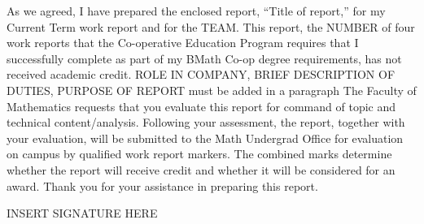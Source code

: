 \documentclass[12pt]{article}
\newcommand{\term}{Current Term } %
\newcommand{\WTT}{Title of report}
\begin{document}




\FirstPage

\newpage




\LetterHead



As we agreed, I have prepared the enclosed report, “\WTT,” for
my \term work report and for the TEAM. This
report, the NUMBER of four work reports that the Co-operative Education Program
requires that I successfully complete as part of my BMath Co-op degree
requirements, has not received academic credit.
\vskip 10pt
ROLE IN COMPANY, BRIEF DESCRIPTION OF DUTIES, PURPOSE OF REPORT must be added in a paragraph
\vskip 10pt 
The Faculty of Mathematics requests that you evaluate this report for command
of topic and technical content/analysis. Following your assessment, the report,
together with your evaluation, will be submitted to the Math Undergrad Office
for evaluation on campus by qualified work report markers. The combined
marks determine whether the report will receive credit and whether it will be
considered for an award.
Thank you for your assistance in preparing this report.

INSERT SIGNATURE HERE






\toc 






\end{document}
